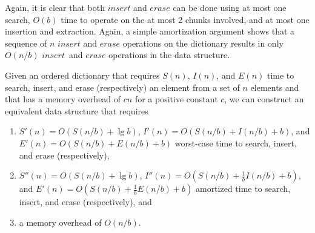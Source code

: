 \documentclass{DIKU-article}
\newcommand{\Insert}{\mbox{$\mathit{insert}$}}
\newcommand{\Erase}{\mbox{$\mathit{erase}$}}
\begin{document}
Again, it is clear that both \Insert{} and \Erase{} can be done using at
most one search, $O(b)$ time to operate on the at most 2 chunks
involved, and at most one insertion and extraction.  Again, a simple
amortization argument shows that a sequence of $n$ \Insert{} and
\Erase{} operations on the dictionary results in only $O(n/b)$ \Insert\
and \Erase{} operations in the data structure.

\begin{theorem}
\label{theorem:elementary-b}
Given an ordered dictionary that requires $S(n)$, $I(n)$, and $E(n)$
time to search, insert, and erase (respectively) an element from a
set of $n$ elements and that has a memory overhead of $cn$ for a
positive constant $c$, we can construct an equivalent data structure
that requires 
\begin{enumerate}
\item $S'(n)=O(S(n/b)+\lg b)$, $I'(n)=O(S(n/b)+I(n/b)+b)$,
and $E'(n)=O(S(n/b)+E(n/b)+b)$ worst-case time to search, insert,
and erase (respectively), 
\item $S''(n)=O(S(n/b)+\lg b)$,
$I''(n)=O(S(n/b)+\frac{1}{b}I(n/b)+b)$, and
$E'(n)=O(S(n/b)+\frac{1}{b}E(n/b)+b)$ amortized time to search,
insert, and erase (respectively), and 
\item a memory overhead of
$O(n/b)$.
\end{enumerate}
\end{theorem}
\end{document}
